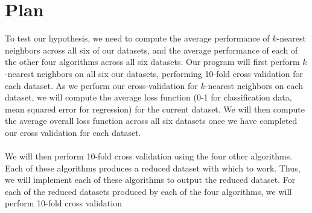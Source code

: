 \documentclass{article}
\begin{document}
\section{Plan}
To test our hypothesis, we need to compute the average performance of $k$-nearest neighbors across all six of our datasets, and the average performance of each of the other four algorithms across all six datasets. Our program will first perform $k$-nearest neighbors on all six our datasets, performing 10-fold cross validation for each dataset. As we perform our cross-validation for $k$-nearest neighbors on each dataset, we will compute the average loss function (0-1 for classification data, mean squared error for regression) for the current dataset. We will then compute the average overall loss function across all six datasets once we have completed our cross validation for each dataset. \\ \\
We will then perform 10-fold cross validation using the four other algorithms. Each of these algorithms produces a reduced dataset with which to work. Thus, we will implement each of these algorithms to output the reduced dataset. For each of the reduced datasets produced by each of the four algorithms, we will perform 10-fold cross validation
\end{document}
